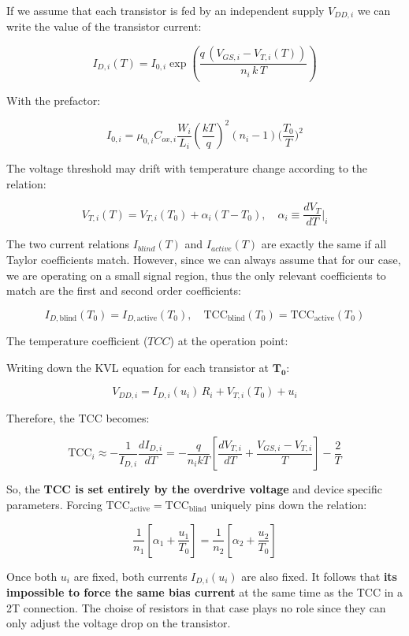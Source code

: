 If we assume that each transistor is fed by an independent supply $V_{DD,i}$ we can write the value of the transistor current:

\begin{equation}
    I_{D,i}(T) = I_{0,i}\exp\!\left(\dfrac{q\,(V_{GS,i}-V_{T,i}(T))}{n_i\,k\,T}\right) 
\end{equation}

With the prefactor:

\begin{equation}
    I_{0,i} = \mu_{0,i} C_{ox,i} \dfrac{W_i}{L_i}\!\left(\dfrac{kT}{q}\right)^{\!2}\!(n_i-1)\Big(\dfrac{T_0}{T}\Big)^{\!2}
\end{equation}

The voltage threshold may drift with temperature change according to the relation:

\begin{equation}
    V_{T,i}(T)=V_{T,i}(T_0)+\alpha_i(T-T_0),\quad \alpha_i\equiv \dfrac{dV_T}{dT}\Big|_i
\end{equation}

The two current relations $I_{blind}(T)$ and $I_{active}(T)$ are exactly the
same if all Taylor coefficients match. However, since we can always assume
that for our case, we are operating on a small signal region, thus the only
relevant coefficients to match are the first and second order coefficients:

\begin{equation}
    I_{D,\mathrm{blind}}(T_0)=I_{D,\mathrm{active}}(T_0),\quad \mathrm{TCC}_{\mathrm{blind}}(T_0)=\mathrm{TCC}_\mathrm{active}(T_0)
\end{equation}

The temperature coefficient ($TCC$) at the operation point:

Writing down the KVL equation for each transistor at $\mathbf{T_0}$:

\begin{equation}
    V_{DD,i} = I_{D,i}(u_i)\,R_i + V_{T,i}(T_0) + u_i
\end{equation}

Therefore, the TCC becomes:

\begin{equation}
    \mathrm{TCC}_i \approx -\dfrac{1}{I_{D,i}}\dfrac{dI_{D,i}}{dT} = -\dfrac{q}{n_i k T}\!\left[\dfrac{dV_{T,i}}{dT}+\dfrac{V_{GS,i}-V_{T,i}}{T}\right] - \dfrac{2}{T}
\end{equation}

So, the \textbf{TCC is set entirely by the overdrive voltage} and device specific parameters. Forcing $\mathrm{TCC}_{\mathrm{active}}=\mathrm{TCC}_{\mathrm{blind}}$ uniquely pins down the relation:

\begin{equation}
    \dfrac{1}{n_1}\!\left[\alpha_1+\dfrac{u_1}{T_0}\right]=\dfrac{1}{n_2}\!\left[\alpha_2+\dfrac{u_2}{T_0}\right]
\end{equation}

Once both $u_i$ are fixed, both currents $I_{D,i}(u_i)$ are also fixed. It follows that \textbf{its impossible to force the same bias current} at the same time as the TCC in a 2T connection. The choise of resistors in that case plays no role since they can only adjust the voltage drop on the transistor.
